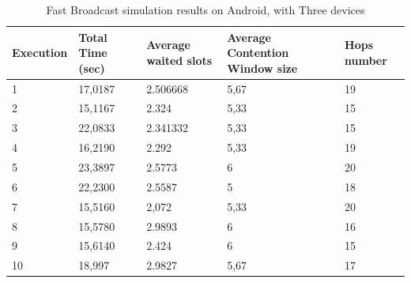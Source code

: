 \begin{table}
\caption{Fast Broadcast simulation results on Android, with Three devices}
\label{tab:Android_res}
\centering
\begin{tabular}{|m{}|m{}|m{}|m{}|m{}|}
\hline
Execution & Total \newline Time (sec) & Average waited slots & Average Contention Window size & Hops \newline number \\
\hline
1 & 17,0187		& 2.506668 	& 5,67 & 19 \\
\hline
2 & 15,1167 	& 2.324	  	& 5,33 & 15 \\ %
\hline
3 & 22,0833 	& 2.341332 	& 5,33 & 15 \\  
\hline
4 & 16,2190 	& 2.292	  	& 5,33 & 19 \\ %
\hline
5 & 23,3897		& 2.5773 & 	6	 & 20 \\ %
\hline
6 & 22,2300 	& 2.5587 	& 5	 & 18 \\ %
\hline
7 & 15,5160 	& 2,072	  	& 5,33 & 20 \\ %
\hline
8 & 15,5780 	& 2.9893 	& 6	 & 16 \\ %
\hline
9 & 15,6140 	& 2.424     & 6	 & 15 \\ %
\hline
10 & 18,997 	& 2.9827 	& 5,67 & 17 \\ %
\hline
\end{tabular}
\end{table}  

